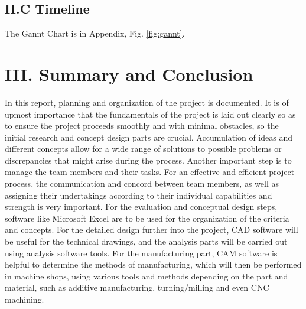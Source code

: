 \documentclass[12pt]{article}
\begin{document}
\subsection*{II.C Timeline}
The Gannt Chart is in Appendix, Fig. \ref{fig:gannt}.

\section*{III. Summary and Conclusion}
In this report, planning and organization of the project is documented. It is of upmost importance that the fundamentals of the project is laid out clearly so as to ensure the project proceeds smoothly and with minimal obstacles, so the initial research and concept design parts are crucial. Accumulation of ideas and different concepts allow for a wide range of solutions to possible problems or discrepancies that might arise during the process. Another important step is to manage the team members and their tasks. For an effective and efficient project process, the communication and concord between team members, as well as assigning their undertakings according to their individual capabilities and strength is very important.
For the evaluation and conceptual design steps, software like Microsoft Excel are to be used for the organization of the criteria and concepts. For the detailed design further into the project, CAD software will be useful for the technical drawings, and the analysis parts will be carried out using analysis software tools. For the manufacturing part, CAM software is helpful to determine the methods of manufacturing, which will then be performed in machine shops, using various tools and methods depending on the part and material, such as additive manufacturing, turning/milling and even CNC machining.

\FloatBarrier

% 
\end{document}
